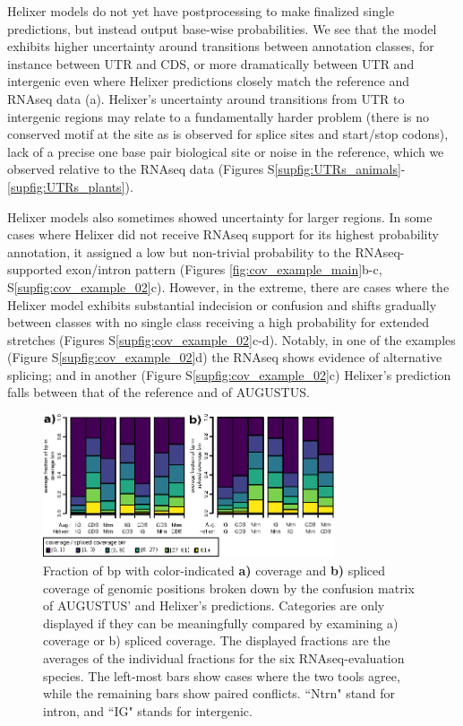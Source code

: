 \documentclass{bioinfo}
\newcounter{supfig}
\begin{document}
Helixer models do not yet have postprocessing
to make finalized single predictions, but instead output base-wise probabilities.
We see that the model exhibits higher uncertainty around transitions between annotation 
classes, for instance between UTR and CDS, or more dramatically between UTR and 
intergenic even where Helixer predictions closely match the reference and RNAseq data (a). 
Helixer's uncertainty around transitions from UTR to intergenic regions may relate to a
fundamentally harder problem (there is no conserved motif at the site as is observed
for splice sites and start/stop codons), lack of a precise one 
base pair biological site \citep{carninci2006genome,hon2013quantification}
or noise in the reference, which we observed relative to the RNAseq data 
(Figures S\ref{supfig:UTRs_animals}-\ref{supfig:UTRs_plants}). %

Helixer models also sometimes showed uncertainty for larger regions.
In some cases where Helixer did not receive RNAseq support for its highest probability
annotation, it assigned a low but non-trivial probability to the RNAseq-supported 
exon/intron pattern (Figures \ref{fig:cov_example_main}b-c, S\ref{supfig:cov_example_02}c). However, in the extreme,
there are cases where the Helixer model exhibits substantial indecision or confusion 
and shifts gradually between classes with no single class receiving a high probability 
for extended stretches (Figures S\ref{supfig:cov_example_02}c-d). 
Notably, in one of the examples (Figure S\ref{supfig:cov_example_02}d)
the RNAseq shows evidence of alternative splicing; 
and in another (Figure S\ref{supfig:cov_example_02}c) Helixer's
prediction falls between that of the reference and of AUGUSTUS.

\begin{figure}[hbt]
\label{fig:average_vs_augustus}
\includegraphics[width=8.6cm]{images/cov_examples/average_vs_augustus} 
\caption{Fraction of bp with color-indicated {\bf a)} coverage and {\bf b)} spliced coverage of genomic positions 
broken down by the confusion matrix of AUGUSTUS' and Helixer's predictions. Categories 
are only displayed if they can be meaningfully compared by examining a) coverage or b) spliced
coverage. The displayed fractions are the averages of the individual fractions for the 
six RNAseq-evaluation species. The left-most bars show cases where the two tools agree, 
while the remaining bars show paired conflicts. ``Ntrn" stand
for intron, and ``IG" stands for intergenic.}
\end{figure}
\end{document}
